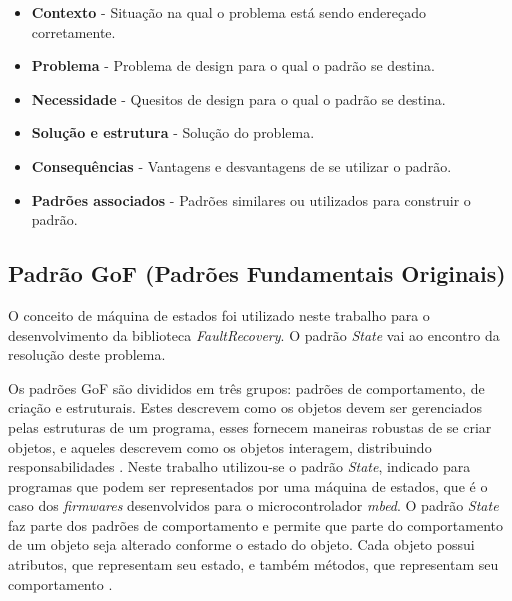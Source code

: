 \begin{itemize}
	\item \textbf{Contexto} - Situação na qual o problema está sendo endereçado corretamente.
	
	\item \textbf{Problema} - Problema de design para o qual o padrão se destina.
	
	\item \textbf{Necessidade} - Quesitos de design para o qual o padrão se destina.
	
	\item \textbf{Solução e estrutura} - Solução do problema.
	
	\item \textbf{Consequências} - Vantagens e desvantagens de se utilizar o padrão.
	
	\item \textbf{Padrões associados} - Padrões similares ou utilizados para construir o padrão.
\end{itemize}

\subsection{Padrão GoF (Padrões Fundamentais Originais)} \label{subsec:gof}

O conceito de máquina de estados foi utilizado neste trabalho  para o desenvolvimento da biblioteca \textit{FaultRecovery}. O padrão \textit{State} vai ao encontro da resolução deste problema.

Os padrões GoF são divididos em três grupos: padrões de comportamento, de criação e estruturais. Estes descrevem como os objetos devem ser gerenciados pelas estruturas de um programa, esses fornecem maneiras robustas de se criar objetos, e aqueles descrevem como os objetos interagem, distribuindo responsabilidades \cite{Engholm:2010}. Neste trabalho utilizou-se o padrão \textit{State}, indicado para programas que podem ser representados por uma máquina de estados, que é o caso dos \textit{firmwares} desenvolvidos para o microcontrolador \textit{mbed}. O padrão \textit{State} faz parte dos padrões de comportamento e permite que parte do comportamento de um objeto seja alterado conforme o estado do objeto. Cada objeto possui atributos, que representam seu estado, e também métodos, que representam seu comportamento \cite{Vinicius:2009}.